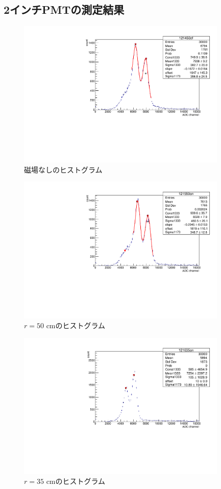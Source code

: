  
\subsection{2インチPMTの測定結果}\label{noFe}

\begin{figure}[tbp]
	\centering
	\includegraphics[angle=-90,width=10cm]{fig/iguchi/121450of.pdf}
	\caption{磁場なしのヒストグラム}
	\label{histoff}
\end{figure}

\begin{figure}[tbp]
	\centering
	\includegraphics[angle=-90,width=10cm]{fig/iguchi/121550on.pdf}
	\caption{$r=50$ cmのヒストグラム}
	\label{hist50}
\end{figure}

\begin{figure}[tbp]
	\centering
	\includegraphics[angle=-90,width=10cm]{fig/iguchi/121635on.pdf}
	\caption{$r=35$ cmのヒストグラム}
	\label{hist35}
\end{figure}

